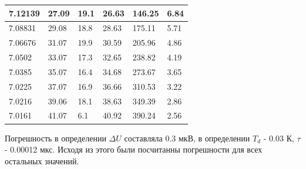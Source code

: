 \documentclass[a4paper, 14pt]{extarticle}%
\begin{document}
\begin{table}[h!]
\begin{tabular}{|l|l|l|l|l|l|}
7.12139                        & 27.09                       & 19.1                        & 26.63                        & 146.25                       & 6.84                                       \\ \hline
\rowcolor[HTML]{FFFFC7} 
7.08831                        & 29.08                       & 18.8                        & 28.63                        & 175.11                       & 5.71                                       \\ \hline
7.06676                        & 31.07                       & 19.9                        & 30.59                        & 205.96                       & 4.86                                       \\ \hline
\rowcolor[HTML]{FFFFC7} 
7.0502                        & 33.07                       & 17.3                        & 32.65                        & 238.82                       & 4.19                                       \\ \hline
7.0385                        & 35.07                       & 16.4                        & 34.68                        & 273.67                       & 3.65                                       \\ \hline
\rowcolor[HTML]{FFFFC7} 
7.0225                        & 37.07                       & 16.9                        & 36.66                        & 310.53                       & 3.22                                       \\ \hline
7.0216                        & 39.06                       & 18.1                        & 38.63                        & 349.39                       & 2.86                                       \\ \hline
\rowcolor[HTML]{FFFFC7} 
7.0161                        & 41.07                       & 6.1                         & 40.92                        & 390.24                       & 2.56                                       \\ \hline
\end{tabular}
\end{table}

Погрешность в определении $\Delta U$ составляла 0.3 мкВ, в определении $T_d$ - 0.03 К, $\tau$ - 0.00012 мкс. Исходя из этого были посчитанны погрешности для всех остальных значений.
\end{document}
